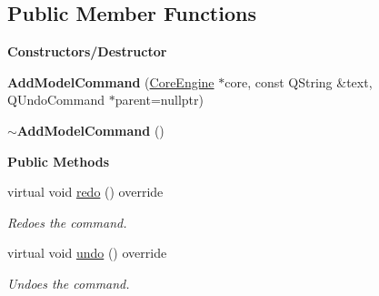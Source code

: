 \subsection*{Public Member Functions}
\begin{Indent}\textbf{ Constructors/\+Destructor}\par
\begin{DoxyCompactItemize}
\item 
\mbox{\label{classrev_1_1_add_model_command_a6b789671b04474cdf669c24eb99b7bb3}} 
{\bfseries Add\+Model\+Command} (\mbox{\hyperlink{classrev_1_1_core_engine}{Core\+Engine}} $\ast$core, const Q\+String \&text, Q\+Undo\+Command $\ast$parent=nullptr)
\item 
\mbox{\label{classrev_1_1_add_model_command_a759245c67b2cfbed9f6433ae9ade36ae}} 
{\bfseries $\sim$\+Add\+Model\+Command} ()
\end{DoxyCompactItemize}
\end{Indent}
\begin{Indent}\textbf{ Public Methods}\par
\begin{DoxyCompactItemize}
\item 
\mbox{\label{classrev_1_1_add_model_command_ae0b0747fb66930b751f492efa54d1481}} 
virtual void \mbox{\hyperlink{classrev_1_1_add_model_command_ae0b0747fb66930b751f492efa54d1481}{redo}} () override
\begin{DoxyCompactList}\small\item\em Redoes the command. \end{DoxyCompactList}\item 
\mbox{\label{classrev_1_1_add_model_command_aaff8a446b88bc9f40f8401814c7531d3}} 
virtual void \mbox{\hyperlink{classrev_1_1_add_model_command_aaff8a446b88bc9f40f8401814c7531d3}{undo}} () override
\begin{DoxyCompactList}\small\item\em Undoes the command. \end{DoxyCompactList}\end{DoxyCompactItemize}
\end{Indent}
